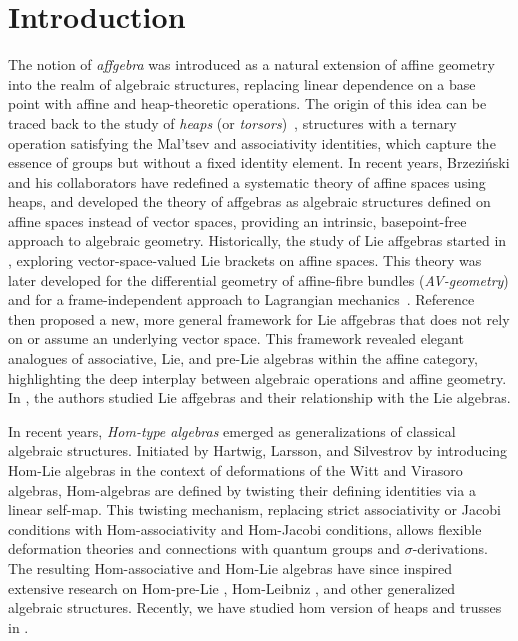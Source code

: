\documentclass[14pt]{article}
\theoremstyle{Definition}
\theoremstyle{remark}
\begin{document}
\section{Introduction}
The notion of \emph{affgebra} was introduced as a natural extension of affine geometry into the realm of algebraic structures, replacing linear dependence on a base point with affine and heap-theoretic operations. The origin of this idea can be traced back to the study of \emph{heaps} (or \emph{torsors})~\cite{Pru1, Bae1, Brz22}, structures with a ternary operation satisfying the Mal’tsev and associativity identities, which capture the essence of groups but without a fixed identity element. In recent years, Brzeziński and his collaborators \cite{Brz1, Brz2, Brz3, Brz222, And1, And2} have redefined a systematic theory of affine spaces using heaps, and developed the theory of affgebras as algebraic structures defined on affine spaces instead of vector spaces, providing an intrinsic, basepoint-free approach to algebraic geometry. Historically, the study of Lie affgebras started in \cite{Gra1}, exploring vector-space-valued Lie brackets on affine spaces. This theory was later developed for the differential geometry of affine-fibre bundles (\emph{AV-geometry})\cite{Gra4, Gra1} and for a frame-independent approach to Lagrangian mechanics~\cite{Gra3, Tul1}. Reference~\cite{Brz1} then proposed a new, more general framework for Lie affgebras that does not rely on or assume an underlying vector space. This framework revealed elegant analogues of associative, Lie, and pre-Lie algebras within the affine category, highlighting the deep interplay between algebraic operations and affine geometry. In \cite{And2}, the authors studied Lie affgebras and their relationship with the Lie algebras.

In recent years, \emph{Hom-type algebras} emerged as generalizations of classical algebraic structures. Initiated by Hartwig, Larsson, and Silvestrov \cite{HLS} by introducing Hom-Lie algebras in the context of deformations of the Witt and Virasoro algebras, Hom-algebras are defined by twisting their defining identities via a linear self-map. This twisting mechanism, replacing strict associativity or Jacobi conditions with Hom-associativity and Hom-Jacobi conditions, allows flexible deformation theories and connections with quantum groups and $\sigma$-derivations. The resulting Hom-associative \cite{MS10,CS} and Hom-Lie algebras\cite{HLS, MS10} have since inspired extensive research on Hom-pre-Lie \cite{MS, GS23}, Hom-Leibniz \cite{MS08,MS, saha20, saha21}, and other generalized algebraic structures. Recently, we have studied hom version of heaps and trusses in \cite{AST}.
\end{document}
